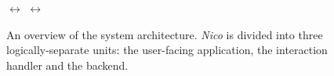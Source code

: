 \documentclass[12pt,twoside,notitlepage,xetex]{report}
\begin{document}
\begin{center}
\begin{figure}[H]
\begin{center}
{\Huge $ \leftrightarrow $}%
{\Huge $ \leftrightarrow $}%
\caption{An overview of the system architecture.  \emph{Nico} is divided into three logically-separate units: the user-facing application, the interaction handler and the backend.}
\end{center}
\end{figure}
\end{center}
\end{document}
